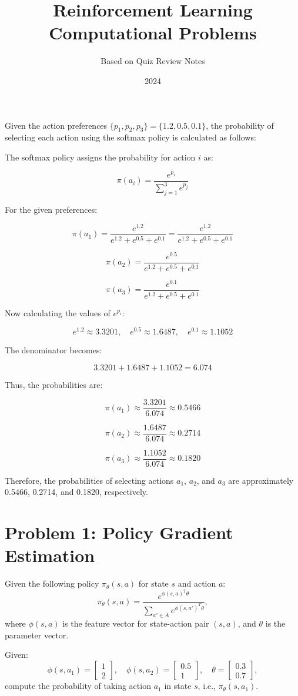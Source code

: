 \documentclass{article}
\title{Reinforcement Learning Computational Problems}
\author{Based on Quiz Review Notes}
\date{2024}
\begin{document}
\maketitle
Given the action preferences \(\{p_1, p_2, p_3\} = \{1.2, 0.5, 0.1\}\), the probability of selecting each action using the softmax policy is calculated as follows:

The softmax policy assigns the probability for action \(i\) as:

\[
\pi(a_i) = \frac{e^{p_i}}{\sum_{j=1}^{3} e^{p_j}}
\]

For the given preferences:

\[
\pi(a_1) = \frac{e^{1.2}}{e^{1.2} + e^{0.5} + e^{0.1}} = \frac{e^{1.2}}{e^{1.2} + e^{0.5} + e^{0.1}}
\]

\[
\pi(a_2) = \frac{e^{0.5}}{e^{1.2} + e^{0.5} + e^{0.1}}
\]

\[
\pi(a_3) = \frac{e^{0.1}}{e^{1.2} + e^{0.5} + e^{0.1}}
\]

Now calculating the values of \(e^{p_i}\):

\[
e^{1.2} \approx 3.3201, \quad e^{0.5} \approx 1.6487, \quad e^{0.1} \approx 1.1052
\]

The denominator becomes:

\[
3.3201 + 1.6487 + 1.1052 = 6.074
\]

Thus, the probabilities are:

\[
\pi(a_1) \approx \frac{3.3201}{6.074} \approx 0.5466
\]

\[
\pi(a_2) \approx \frac{1.6487}{6.074} \approx 0.2714
\]

\[
\pi(a_3) \approx \frac{1.1052}{6.074} \approx 0.1820
\]

Therefore, the probabilities of selecting actions \(a_1\), \(a_2\), and \(a_3\) are approximately 0.5466, 0.2714, and 0.1820, respectively.



\section*{Problem 1: Policy Gradient Estimation}
Given the following policy \( \pi_{\theta}(s, a) \) for state \( s \) and action \( a \):
\[
\pi_{\theta}(s, a) = \frac{e^{\phi(s, a)^T \theta}}{\sum_{a' \in A} e^{\phi(s, a')^T \theta}},
\]
where \( \phi(s, a) \) is the feature vector for state-action pair \( (s, a) \), and \( \theta \) is the parameter vector.

Given:
\[
\phi(s, a_1) = \begin{bmatrix} 1 \\ 2 \end{bmatrix}, \quad \phi(s, a_2) = \begin{bmatrix} 0.5 \\ 1 \end{bmatrix}, \quad \theta = \begin{bmatrix} 0.3 \\ 0.7 \end{bmatrix},
\]
compute the probability of taking action \( a_1 \) in state \( s \), i.e., \( \pi_{\theta}(s, a_1) \).
\end{document}
